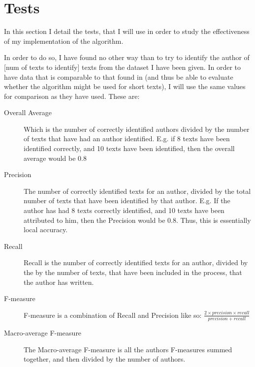 \section{Tests}
\label{tests}

In this section I detail the tests, that I will use in order to study the effectiveness of my implementation of the algorithm.

In order to do so, I have found no other way than to try to identify the author of [num of texts to identify] texts from the dataset I have been given. In order to have data that is comparable to that found in \cite{nr4} (and thus be able to evaluate whether the algorithm might be used for short texts), I will use the same values for comparison as they have used. These are: 


\begin{description}
\item[Overall Average] Which is the number of correctly identified authors divided by the number of texts that have had an author identified. E.g. if 8 texts have been identified correctly, and 10 texts have been identified, then the overall average would be 0.8 

\item[Precision] The number of correctly identified texts for an author, divided by the total number of texts that have been identified by that author. E.g. If the author has had 8 texts correctly identified, and 10 texts have been attributed to him, then the Precision would be 0.8. Thus, this is essentially local accuracy.

\item[Recall] Recall is the number of correctly identified texts for an author, divided by the by the number of texts, that have been included in the process, that the author has written.

\item[F-measure] F-measure is a combination of Recall and Precision like so: $\frac{2 \times precision \times recall}{precision+recall}$ 

\item[Macro-average F-measure] The Macro-average F-measure is all the authors F-measures summed together, and then divided by the number of authors. 
\end{description}

